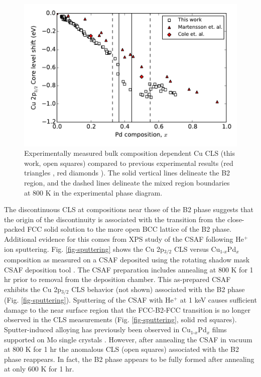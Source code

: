 \documentclass[number, sort&compress, review, 12pt]{elsarticle}
\begin{document}
\begin{figure}[H]
\centering
\includegraphics[width=6in]{experiment}
\caption{\label{fig-lit}Experimentally measured bulk composition dependent Cu CLS (this work, open squares) compared to previous experimental results (red triangles \cite{martensson-1981-elect-cu}, red diamonds \cite{cole-1997-deter-charg}). The solid vertical lines delineate the B2 region, and the dashed lines delineate the mixed region boundaries at 800 K in the experimental phase diagram.}
\end{figure}

The discontinuous CLS at compositions near those of the B2 phase suggests that the origin of the discontinuity is associated with the transition from the close-packed FCC solid solution to the more open BCC lattice of the B2 phase. Additional evidence for this comes from XPS study of the CSAF following He$^{\text{+}}$ ion sputtering. Fig. \ref{fig-sputtering} shows the Cu 2p$_{\text{3/2}}$ CLS versus Cu$_{\text{1-}x}$Pd$_x$ composition as measured on a CSAF deposited using the rotating shadow mask CSAF deposition tool \cite{fleutot-2012-appar-depos}.  The CSAF preparation includes annealing at 800 K for 1 hr prior to removal from the deposition chamber. This as-prepared CSAF exhibits the Cu 2p$_{\text{3/2}}$ CLS behavior (not shown) associated with the B2 phase (Fig. \ref{fig-sputtering}). Sputtering of the CSAF with He$^+$ at 1 keV causes sufficient damage to the near surface region that the FCC-B2-FCC transition is no longer observed in the CLS measurements (Fig. \ref{fig-sputtering}, solid red squares). Sputter-induced alloying has previously been observed in Cu$_{\text{1-}x}$Pd$_x$ films supported on Mo single crystals \cite{rainer-1995-core-level}. However, after annealing the CSAF in vacuum at 800 K for 1 hr the anomalous CLS (open squares) associated with the B2 phase reappears. In fact, the B2 phase appears to be fully formed after annealing at only 600 K for 1 hr.
\end{document}
